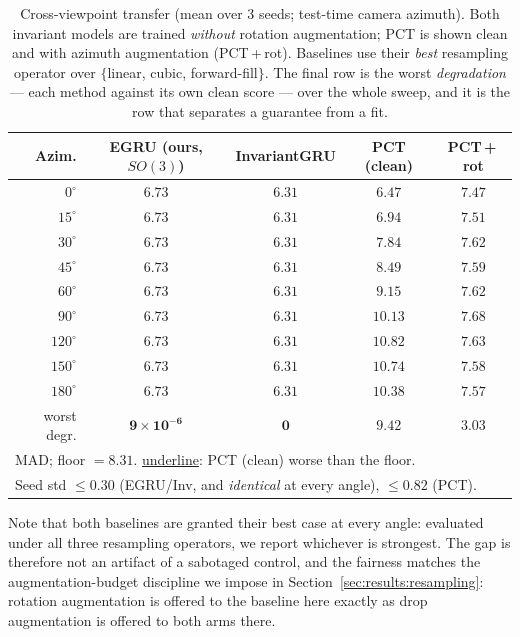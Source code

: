 \begin{table}[!t]
\centering
\caption{Cross-viewpoint transfer (mean over 3 seeds; test-time camera azimuth). Both invariant
models are trained \emph{without} rotation augmentation; PCT is shown clean and with azimuth
augmentation (PCT\,+\,rot). Baselines use their \emph{best} resampling operator over $\{$linear,
cubic, forward-fill$\}$. The final row is the worst \emph{degradation} --- each method against its
own clean score --- over the whole sweep, and it is the row that separates a guarantee from a fit.}
\label{tab:viewpoint}
\scriptsize
\setlength{\tabcolsep}{3pt}
\begin{tabular}{rcccc}
\toprule
Azim. & EGRU (ours, $SO(3)$) & InvariantGRU & PCT (clean) & PCT\,+\,rot \\
\midrule
$0^\circ$   & $6.73$ & $6.31$ & $6.47$ & $7.47$ \\
$15^\circ$  & $6.73$ & $6.31$ & $6.94$ & $7.51$ \\
$30^\circ$  & $6.73$ & $6.31$ & $7.84$ & $7.62$ \\
$45^\circ$  & $6.73$ & $6.31$ & \underline{$8.49$} & $7.59$ \\
$60^\circ$  & $6.73$ & $6.31$ & \underline{$9.15$} & $7.62$ \\
$90^\circ$  & $6.73$ & $6.31$ & \underline{$10.13$} & $7.68$ \\
$120^\circ$ & $6.73$ & $6.31$ & \underline{$10.82$} & $7.63$ \\
$150^\circ$ & $6.73$ & $6.31$ & \underline{$10.74$} & $7.58$ \\
$180^\circ$ & $6.73$ & $6.31$ & \underline{$10.38$} & $7.57$ \\
\midrule
worst degr. & $\mathbf{9\!\times\!10^{-6}}$ & $\mathbf{0}$ & $9.42$ & $3.03$ \\
\midrule
\multicolumn{5}{l}{\footnotesize MAD; floor $=8.31$. \underline{underline}: PCT (clean) worse than the
floor.} \\
\multicolumn{5}{l}{\footnotesize Seed std $\le0.30$ (EGRU/Inv, and \emph{identical} at every angle),
$\le0.82$ (PCT).} \\
\bottomrule
\end{tabular}
\end{table}

Note that both baselines are granted their best case at every angle: evaluated under all three
resampling operators, we report whichever is strongest. The gap is therefore not an artifact of a
sabotaged control, and the fairness matches the augmentation-budget discipline we impose in
Section~\ref{sec:results:resampling}: rotation augmentation is offered to the baseline here exactly
as drop augmentation is offered to both arms there.

